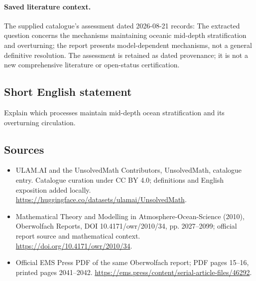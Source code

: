 \documentclass[11pt]{article}
\begin{document}
\paragraph{Saved literature context.} The supplied catalogue's assessment dated 2026-08-21 records: The extracted question concerns the mechanisms maintaining oceanic mid-depth stratification and overturning; the report presents model-dependent mechanisms, not a general definitive resolution. The assessment is retained as dated provenance; it is not a new comprehensive literature or open-status certification.
\subsection{Short English statement}
Explain which processes maintain mid-depth ocean stratification and its overturning circulation.
\subsection{Sources}
\begin{itemize}
\item[\hypertarget{source:statement:1}{S1}] ULAM.AI and the UnsolvedMath Contributors, UnsolvedMath, catalogue entry. Catalogue curation under CC BY 4.0; definitions and English exposition added locally.
\url{https://huggingface.co/datasets/ulamai/UnsolvedMath}.
\item[\hypertarget{source:statement:2}{S2}] Mathematical Theory and Modelling in Atmosphere-Ocean-Science (2010), Oberwolfach Reports, DOI 10.4171/owr/2010/34, pp. 2027--2099; official report source and mathematical context.
\url{https://doi.org/10.4171/owr/2010/34}.
\item[\hypertarget{source:statement:3}{S3}] Official EMS Press PDF of the same Oberwolfach report; PDF pages 15--16, printed pages 2041--2042.
\url{https://ems.press/content/serial-article-files/46292}.
\end{itemize}
\label{end:statement}
\end{document}
